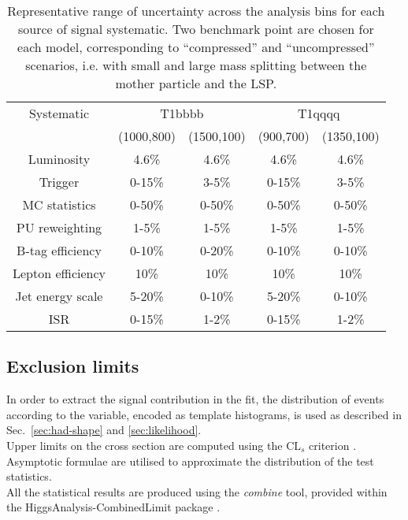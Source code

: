 \begin{table}[h!]
  \caption{Representative range of uncertainty across the analysis bins 
    for each source of signal systematic.
    Two benchmark point are chosen for each model, 
    corresponding to ``compressed'' and ``uncompressed'' scenarios, 
    i.e. with small and large mass splitting between the mother particle and the LSP.
  }
  \label{tab:sig-systematics}
  \centering
  \begin{tabular}{ ccccc }
    \hline
    \hline
    Systematic & \multicolumn{2}{c}{T1bbbb} & \multicolumn{2}{c}{T1qqqq} \\ 
                      & (1000,800) & (1500,100) & (900,700) & (1350,100) \\
    \hline
    Luminosity        & 4.6\%      & 4.6\%      & 4.6\%     & 4.6\%      \\ \hline
    Trigger           & 0-15\%     & 3-5\%      & 0-15\%    & 3-5\%      \\ \hline
    MC statistics     & 0-50\%     & 0-50\%     & 0-50\%    & 0-50\%     \\ \hline
    PU reweighting    & 1-5\%      & 1-5\%      & 1-5\%     & 1-5\%      \\ \hline
    B-tag efficiency  & 0-10\%     & 0-20\%     & 0-10\%    & 0-10\%     \\ \hline
    Lepton efficiency & 10\%       & 10\%       & 10\%      & 10\%       \\ \hline
    Jet energy scale  & 5-20\%     & 0-10\%     & 5-20\%    & 0-10\%     \\ \hline
    ISR               & 0-15\%     & 1-2\%      & 0-15\%    & 1-2\%      \\
    \hline
    \hline
  \end{tabular}
\end{table}



\subsection{Exclusion limits}
\label{sec:susy_results}

In order to extract the signal contribution in the fit, the distribution of events according to the \mht variable, 
encoded as template histograms, is used as described in Sec.~\ref{sec:had-shape} and \ref{sec:likelihood}. \\
Upper limits on the cross section are computed using the $\text{CL}_{s}$ criterion \cite{CLsTechnique}. 
Asymptotic formulae \cite{AsymptoticFormulae} are utilised to approximate the distribution of the test statistics. \\
All the statistical results are produced using the \textit{combine} tool, 
provided within the HiggsAnalysis-CombinedLimit package \cite{Combine}. 

